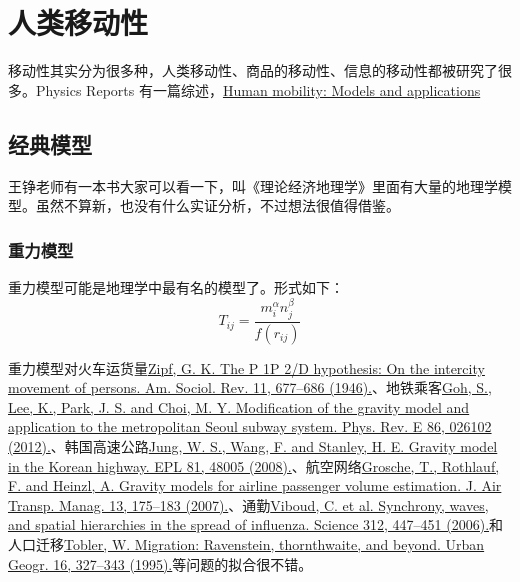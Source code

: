 \chapter{人类移动性}

移动性其实分为很多种，人类移动性、商品的移动性、信息的移动性都被研究了很多。Physics Reports 有一篇综述，\href{https://www.sciencedirect.com/science/article/pii/S037015731830022X}{Human mobility: Models and applications}

\section{经典模型}

王铮老师有一本书大家可以看一下，叫《理论经济地理学》里面有大量的地理学模型。虽然不算新，也没有什么实证分析，不过想法很值得借鉴。

\subsection{重力模型}

重力模型可能是地理学中最有名的模型了。形式如下：\begin{equation}
T_{i j}=\frac{m_{i}^{\alpha} n_{j}^{\beta}}{f\left(r_{i j}\right)}
\end{equation}

重力模型对火车运货量\href{https://www.jstor.org/stable/2087063?origin=crossref}{Zipf, G. K. The P 1P 2/D hypothesis: On the intercity movement of persons. Am. Sociol. Rev. 11, 677–686 (1946).}、地铁乘客\href{https://journals.aps.org/pre/abstract/10.1103/PhysRevE.86.026102}{Goh, S., Lee, K., Park, J. S. and Choi, M. Y. Modification of the gravity model and application to the metropolitan Seoul subway system. Phys. Rev. E 86, 026102 (2012).}、韩国高速公路\href{https://iopscience.iop.org/article/10.1209/0295-5075/81/48005}{Jung, W. S., Wang, F. and Stanley, H. E. Gravity model in the Korean highway. EPL 81, 48005 (2008).}、航空网络\href{https://doi.org/10.1016/j.jairtraman.2007.02.001}{Grosche, T., Rothlauf, F. and Heinzl, A. Gravity models for airline passenger volume estimation. J. Air Transp. Manag. 13, 175–183 (2007).}、通勤\href{https://science.sciencemag.org/content/312/5772/447}{Viboud, C. et al. Synchrony, waves, and spatial hierarchies in the spread of influenza. Science 312, 447–451 (2006).}和人口迁移\href{https://www.tandfonline.com/doi/abs/10.2747/0272-3638.16.4.327}{Tobler, W. Migration: Ravenstein, thornthwaite, and beyond. Urban Geogr. 16, 327–343 (1995).}等问题的拟合很不错。

